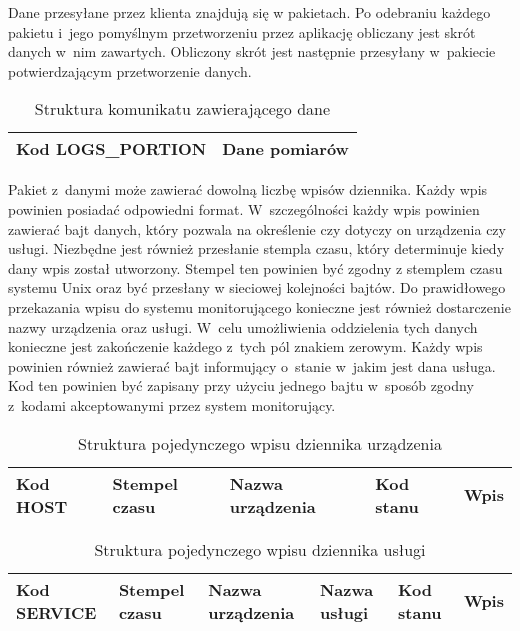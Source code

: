 Dane przesyłane przez klienta znajdują się w pakietach. Po odebraniu
każdego pakietu i~jego pomyślnym przetworzeniu przez aplikację
obliczany jest skrót danych w~nim zawartych. Obliczony skrót jest
następnie przesyłany w~pakiecie potwierdzającym przetworzenie danych.

\begin{table}[H]
\centering
\caption{Struktura komunikatu zawierającego dane }
\begin{tabular}{|p{3cm}|p{6cm}|}
\hline
\raggedright{Kod LOGS\_PORTION} & Dane pomiarów  \\
\hline
\end{tabular}
\end{table}

Pakiet z~danymi może zawierać dowolną liczbę wpisów dziennika. Każdy
wpis powinien posiadać odpowiedni format. W~szczególności każdy wpis
powinien zawierać bajt danych, który pozwala na określenie czy dotyczy
on urządzenia czy usługi. Niezbędne jest również przesłanie stempla
czasu, który determinuje kiedy dany wpis został utworzony. Stempel ten
powinien być zgodny z stemplem czasu systemu Unix oraz być przesłany w
sieciowej kolejności bajtów. Do prawidłowego przekazania wpisu do
systemu monitorującego konieczne jest również dostarczenie nazwy
urządzenia oraz usługi. W~celu umożliwienia oddzielenia tych danych
konieczne jest zakończenie każdego z~tych pól znakiem zerowym. Każdy
wpis powinien również zawierać bajt informujący o~stanie w~jakim jest
dana usługa. Kod ten powinien być zapisany przy użyciu jednego bajtu
w~sposób zgodny z~kodami akceptowanymi przez system monitorujący.

\begin{table}[H]
\centering
\caption{Struktura pojedynczego wpisu dziennika urządzenia }
\begin{tabular}{|p{2cm}|p{3cm}|p{4cm}|p{2cm}|p{2cm}|}
\hline
Kod HOST & Stempel czasu & Nazwa urządzenia & Kod stanu & Wpis  \\
\hline
\end{tabular}
\end{table}

\begin{table}[H]
\centering
\caption{Struktura pojedynczego wpisu dziennika usługi }
\begin{tabular}{|p{2cm}|p{2cm}|p{3cm}|p{2cm}|p{1cm}|p{2cm}|}
  \hline
  \raggedright{Kod SERVICE} & \raggedright{Stempel czasu} & \raggedright{Nazwa urządzenia} & \raggedright{Nazwa usługi} & \raggedright{Kod stanu} & Wpis  \\
  \hline
\end{tabular}
\end{table}

